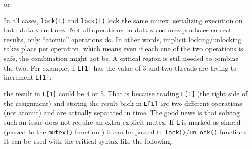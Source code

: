 or


In all cases, \texttt{lock(L)} and
\texttt{lock(T)} lock the same mutex, serializing execution
on both data structures. Not all operations on data structures produces
correct results, only {\textquotedblleft}atomic{\textquotedblright}
operations do. In other words, implicit locking/unlocking takes place
per operation, which means even if each one of the two operations is
safe, the combination might not be. A critical region is still needed
to combine the two. For example, if
\texttt{L}\texttt{[1]} has the value of 3 and two
threads are trying to increment \texttt{L[1]}:


the result in \texttt{L[1]} could be 4 or 5. That is because
reading \texttt{L[1]} (the right side of the assignment) and
storing the result back in \texttt{L[1]} are two different
operations (not atomic) and are actually separated in time. The good
news is that solving such an issue does not require an extra explicit
mutex. If \texttt{L} is marked as shared (passed to the
\texttt{mutex()} function ) it can be passed to
\texttt{lock()}/\texttt{unlock()} functions. It
can be used with the critical syntax like the following: \ 



